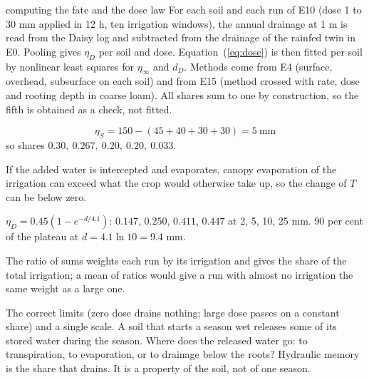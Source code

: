 
\begin{daisybox}{computing the fate and the dose law}
For each soil and each run of E10 (dose 1 to 30 mm applied in 12 h, ten irrigation windows), the annual drainage at 1 m is read from the Daisy log and subtracted from the drainage of the rainfed twin in E0. Pooling gives $\eta_D$ per soil and dose. Equation~(\ref{eq:dose}) is then fitted per soil by nonlinear least squares for $\eta_\infty$ and $d_D$. Methods come from E4 (surface, overhead, subsurface on each soil) and from E15 (method crossed with rate, dose and rooting depth in coarse loam). All shares sum to one by construction, so the fifth is obtained as a check, not fitted.
\end{daisybox}

\sol {}\ans \[\eta_S=150-(45+40+30+30)=5\ \text{mm}\]
so shares $0.30,\ 0.267,\ 0.20,\ 0.20,\ 0.033$. \finans

\sol  If the added water is intercepted and evaporates, canopy evaporation of the irrigation can exceed what the crop would otherwise take up, so the change of $T$ can be below zero. \finans

\sol {}\ans $\eta_D=0.45(1-e^{-d/4.1})$: $0.147$, $0.250$, $0.411$, $0.447$ at 2, 5, 10, 25 mm. 90 per cent of the plateau at $d=4.1\ln10=9.4$ mm. \finans

\sol  The ratio of sums weights each run by its irrigation and gives the share of the total irrigation; a mean of ratios would give a run with almost no irrigation the same weight as a large one. \finans

\sol  The correct limits (zero dose drains nothing; large dose passes on a constant share) and a single scale.
\label{ch:mem}
A soil that starts a season wet releases some of its stored water during the season. Where does the released water go: to transpiration, to evaporation, or to drainage below the roots? Hydraulic memory is the share that drains. It is a property of the soil, not of one season. \finans

